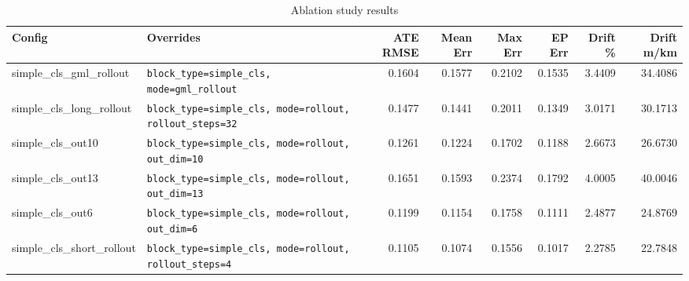\begin{table}[ht]
\centering
\caption{Ablation study results}
\label{tab:ablation}
\small
\setlength{\tabcolsep}{4pt}
\begin{tabular}{ll rr rr rr}
\toprule
\textbf{Config} & \textbf{Overrides} &
\textbf{ATE RMSE} & \textbf{Mean Err} &
\textbf{Max Err} & \textbf{EP Err} &
\textbf{Drift \%} & \textbf{Drift m/km} \\
\midrule
simple\_cls\_gml\_rollout & \texttt{block\_type=simple\_cls, mode=gml\_rollout} & 0.1604 & 0.1577 & 0.2102 & 0.1535 & 3.4409 & 34.4086 \\
simple\_cls\_long\_rollout & \texttt{block\_type=simple\_cls, mode=rollout, rollout\_steps=32} & 0.1477 & 0.1441 & 0.2011 & 0.1349 & 3.0171 & 30.1713 \\
simple\_cls\_out10 & \texttt{block\_type=simple\_cls, mode=rollout, out\_dim=10} & 0.1261 & 0.1224 & 0.1702 & 0.1188 & 2.6673 & 26.6730 \\
simple\_cls\_out13 & \texttt{block\_type=simple\_cls, mode=rollout, out\_dim=13} & 0.1651 & 0.1593 & 0.2374 & 0.1792 & 4.0005 & 40.0046 \\
simple\_cls\_out6 & \texttt{block\_type=simple\_cls, mode=rollout, out\_dim=6} & 0.1199 & 0.1154 & 0.1758 & 0.1111 & 2.4877 & 24.8769 \\
simple\_cls\_short\_rollout & \texttt{block\_type=simple\_cls, mode=rollout, rollout\_steps=4} & 0.1105 & 0.1074 & 0.1556 & 0.1017 & 2.2785 & 22.7848 \\
\bottomrule
\end{tabular}
\end{table}
